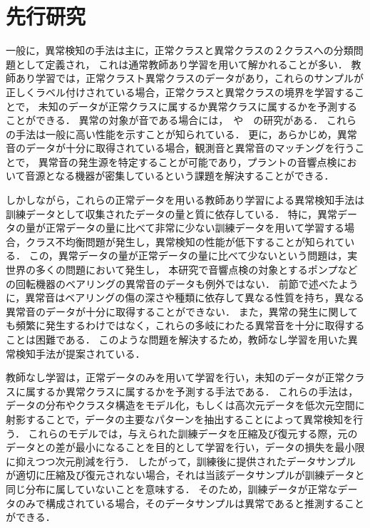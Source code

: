 \documentclass[../main]{subfiles}
\begin{document}
\section{先行研究}
\label{sec:intro_previous-research}
一般に，異常検知の手法は主に，正常クラスと異常クラスの２クラスへの分類問題として定義され，
これは通常教師あり学習を用いて解かれることが多い．
教師あり学習では，正常クラスト異常クラスのデータがあり，これらのサンプルが正しくラベル付けされている場合，正常クラスと異常クラスの境界を学習することで，
未知のデータが正常クラスに属するか異常クラスに属するかを予測することができる．
異常の対象が音である場合には，　や　の研究がある．
これらの手法は一般に高い性能を示すことが知られている．
更に，あらかじめ，異常音のデータが十分に取得されている場合，観測音と異常音のマッチングを行うことで，
異常音の発生源を特定することが可能であり，プラントの音響点検において音源となる機器が密集しているという課題を解決することができる．

しかしながら，これらの正常データを用いる教師あり学習による異常検知手法は訓練データとして収集されたデータの量と質に依存している．
特に，異常データの量が正常データの量に比べて非常に少ない訓練データを用いて学習する場合，クラス不均衡問題が発生し，異常検知の性能が低下することが知られている．
この，異常データの量が正常データの量に比べて少ないという問題は，実世界の多くの問題において発生し，
本研究で音響点検の対象とするポンプなどの回転機器のベアリングの異常音のデータも例外ではない．
前節で述べたように，異常音はベアリングの傷の深さや種類に依存して異なる性質を持ち，異なる異常音のデータが十分に取得することができない．
また，異常の発生に関しても頻繁に発生するわけではなく，これらの多岐にわたる異常音を十分に取得することは困難である．
このような問題を解決するため，教師なし学習を用いた異常検知手法が提案されている．

教師なし学習は，正常データのみを用いて学習を行い，未知のデータが正常クラスに属するか異常クラスに属するかを予測する手法である．
これらの手法は，データの分布やクラスタ構造をモデル化，もしくは高次元データを低次元空間に射影することで，データの主要なパターンを抽出することによって異常検知を行う．
これらのモデルでは，与えられた訓練データを圧縮及び復元する際，元のデータとの差が最小になることを目的として学習を行い，データの損失を最小限に抑えつつ次元削減を行う．
したがって，訓練後に提供されたデータサンプルが適切に圧縮及び復元されない場合，それは当該データサンプルが訓練データと同じ分布に属していないことを意味する．
そのため，訓練データが正常なデータのみで構成されている場合，そのデータサンプルは異常であると推測することができる．
\end{document}
